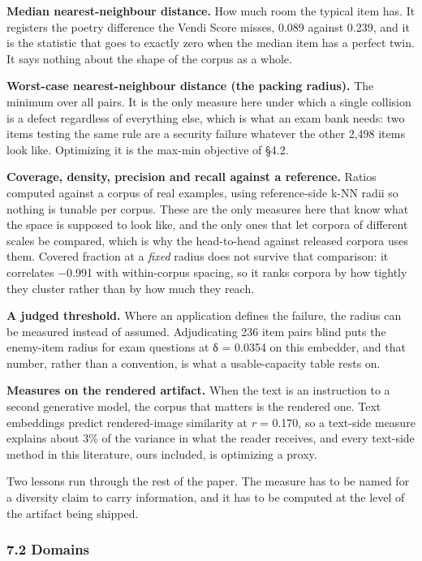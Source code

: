 \documentclass[
  10pt,
]{article}
\theoremstyle{plain}
\theoremstyle{definition}
\begin{document}
\textbf{Median nearest-neighbour distance.} How much room the typical
item has. It registers the poetry difference the Vendi Score misses,
0.089 against 0.239, and it is the statistic that goes to exactly zero
when the median item has a perfect twin. It says nothing about the shape
of the corpus as a whole.

\textbf{Worst-case nearest-neighbour distance (the packing radius).} The
minimum over all pairs. It is the only measure here under which a single
collision is a defect regardless of everything else, which is what an
exam bank needs: two items testing the same rule are a security failure
whatever the other 2,498 items look like. Optimizing it is the max-min
objective of §4.2.

\textbf{Coverage, density, precision and recall against a reference.}
Ratios computed against a corpus of real examples, using reference-side
k-NN radii so nothing is tunable per corpus. These are the only measures
here that know what the space is supposed to look like, and the only
ones that let corpora of different scales be compared, which is why the
head-to-head against released corpora uses them. Covered fraction at a
\emph{fixed} radius does not survive that comparison: it correlates
−0.991 with within-corpus spacing, so it ranks corpora by how tightly
they cluster rather than by how much they reach.

\textbf{A judged threshold.} Where an application defines the failure,
the radius can be measured instead of assumed. Adjudicating 236 item
pairs blind puts the enemy-item radius for exam questions at δ = 0.0354
on this embedder, and that number, rather than a convention, is what a
usable-capacity table rests on.

\textbf{Measures on the rendered artifact.} When the text is an
instruction to a second generative model, the corpus that matters is the
rendered one. Text embeddings predict rendered-image similarity at
\emph{r} = 0.170, so a text-side measure explains about 3\% of the
variance in what the reader receives, and every text-side method in this
literature, ours included, is optimizing a proxy.

Two lessons run through the rest of the paper. The measure has to be
named for a diversity claim to carry information, and it has to be
computed at the level of the artifact being shipped.

\subsubsection{7.2 Domains}\label{72-domains}
\end{document}
